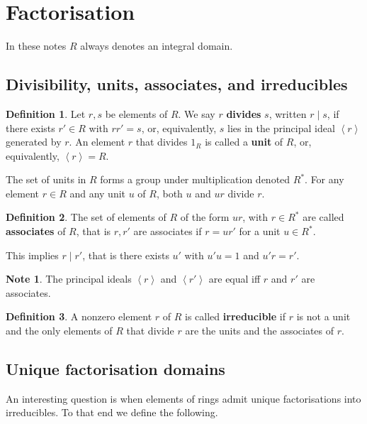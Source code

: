 \documentclass{article}
\newcommand{\ab}[1]{\left\langle #1 \right\rangle}
\theoremstyle{definition}\newtheorem{definition}{Definition}[section]
\theoremstyle{definition}\newtheorem{remark}[definition]{Remark}
\theoremstyle{definition}\newtheorem*{example}{Example}
\theoremstyle{definition}\newtheorem*{note}{Note}
\begin{document}
\section{Factorisation}

In these notes $ R $ always denotes an integral domain.

\subsection{Divisibility, units, associates, and irreducibles}

\begin{definition}
Let $ r, s $ be elements of $ R $. We say $ r $ \textbf{divides} $ s $, written $ r \mid s $, if there exists $ r' \in R $ with $ rr' = s $, or, equivalently, $ s $ lies in the principal ideal $ \ab{r} $ generated by $ r $. An element $ r $ that divides $ 1_R $ is called a \textbf{unit} of $ R $, or, equivalently, $ \ab{r} = R $.
\end{definition}

The set of units in $ R $ forms a group under multiplication denoted $ R^* $. For any element $ r \in R $ and any unit $ u $ of $ R $, both $ u $ and $ ur $ divide $ r $.

\begin{definition}
The set of elements of $ R $ of the form $ ur $, with $ r \in R^* $ are called \textbf{associates} of $ R $, that is $ r, r' $ are associates if $ r = ur' $ for a unit $ u \in R^* $.
\end{definition}

This implies $ r \mid r' $, that is there exists $ u' $ with $ u'u = 1 $ and $ u'r = r' $.

\begin{note}
The principal ideals $ \ab{r} $ and $ \ab{r'} $ are equal iff $ r $ and $ r' $ are associates.
\end{note}

\begin{definition}
A nonzero element $ r $ of $ R $ is called \textbf{irreducible} if $ r $ is not a unit and the only elements of $ R $ that divide $ r $ are the units and the associates of $ r $.
\end{definition}

\subsection{Unique factorisation domains}

An interesting question is when elements of rings admit unique factorisations into irreducibles. To that end we define the following.
\end{document}
